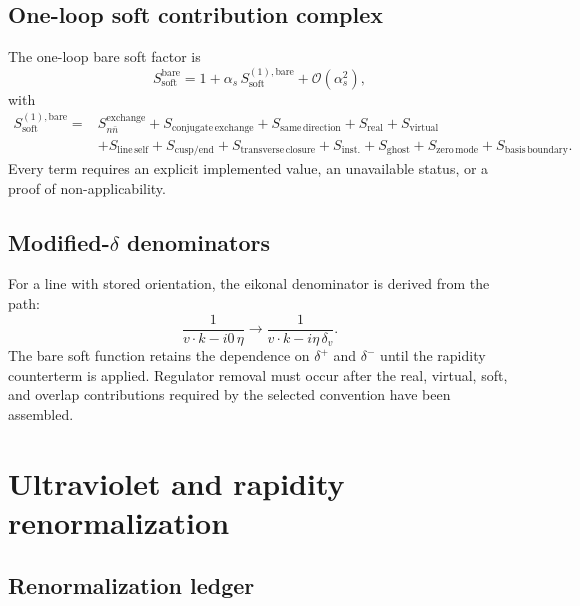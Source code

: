 \documentclass[11pt]{article}
\newcommand{\Soft}{\ensuremath{\mathrm{soft}}}
\newcommand{\Bare}{\ensuremath{\mathrm{bare}}}
\newcommand{\order}{\mathcal O}
\newcommand{\as}{\alpha_s}
\begin{document}
\subsection{One-loop soft contribution complex}

The one-loop bare soft factor is
\begin{equation}
 S_{\Soft}^{\Bare}
 =
 1+\as\,S_{\Soft}^{(1),\Bare}
 +\order(\as^2),
 \label{eq:soft-loop-expansion}
\end{equation}
with
\begin{align}
 S_{\Soft}^{(1),\Bare}
 ={}&
 S_{n\bar n}^{\mathrm{exchange}}
 +S_{\mathrm{conjugate\,exchange}}
 +S_{\mathrm{same\,direction}}
 +S_{\mathrm{real}}
 +S_{\mathrm{virtual}}
 \nonumber\\
 &+
 S_{\mathrm{line\,self}}
 +S_{\mathrm{cusp/end}}
 +S_{\mathrm{transverse\,closure}}
 +S_{\mathrm{inst.}}
 +S_{\mathrm{ghost}}
 +S_{\mathrm{zero\,mode}}
 +S_{\mathrm{basis\,boundary}}.
 \label{eq:soft-contributions}
\end{align}
Every term requires an explicit implemented value, an unavailable status, or a proof of non-applicability.

\subsection{Modified-\texorpdfstring{\(\delta\)}{delta} denominators}

For a line with stored orientation, the eikonal denominator is derived from the path:
\begin{equation}
 \frac{1}{v\cdot k-i0\,\eta}
 \longrightarrow
 \frac{1}{v\cdot k-i\eta\,\delta_v}.
 \label{eq:eikonal-delta}
\end{equation}
The bare soft function retains the dependence on \(\delta^+\) and \(\delta^-\) until the rapidity counterterm is applied.  Regulator removal must occur after the real, virtual, soft, and overlap contributions required by the selected convention have been assembled.

\section{Ultraviolet and rapidity renormalization}
\label{sec:renormalization}

\subsection{Renormalization ledger}
\end{document}
